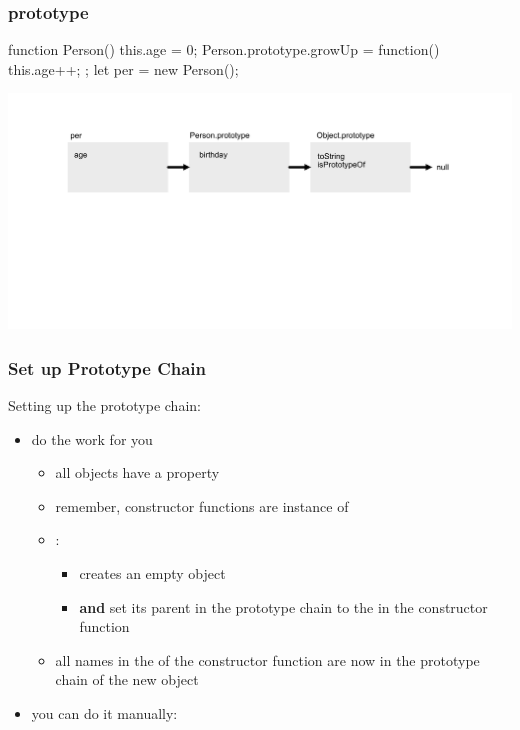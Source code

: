 \begin{frame}[fragile] \frametitle{prototype}
\begin{CodeBox}{}
function Person() {
  this.age = 0;
}
Person.prototype.growUp = function() { this.age++; };
let per = new Person();
\end{CodeBox}
  \centering
  \includegraphics[width=14cm]{img/prototype_chain3}
\end{frame}

\begin{frame}[fragile] \frametitle{Set up Prototype Chain}
Setting up the prototype chain:
\begin{itemize}
  \item {} do the work for you
  \begin{itemize}
    \item all  objects have a property 
    \item remember, constructor functions are instance of 
    \item {}:
    \begin{itemize}
      \item creates an empty object
      \item {\bf and} set its parent in the prototype chain to the  in the constructor function
    \end{itemize}
    \item all names in the  of the constructor function are now in the prototype chain of the new object
  \end{itemize}
  \item you can do it manually: 
\end{itemize}
\end{frame}

